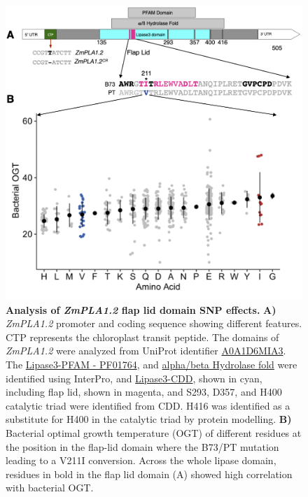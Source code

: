 \documentclass[9pt,twocolumn,twoside,lineno]{BioRxiv}
\begin{document}
\begin{figure}[ht]
\begin{center}
\includegraphics[width=0.4\paperwidth]{Figures/Fig_5.png}
\caption{\textbf{Analysis of \textit{ZmPLA1.2} flap lid domain SNP effects.}  
\textbf{A)} \textit{ZmPLA1.2} promoter and coding sequence showing different features. CTP represents the chloroplast transit peptide. 
The domains of \textit{ZmPLA1.2} were analyzed from UniProt identifier \hyperlink{https://www.uniprot.org/uniprot/A0A1D6MIA3}{A0A1D6MIA3}. 
The \hyperlink{https://www.ebi.ac.uk/interpro/entry/pfam/PF01764/}{Lipase3-PFAM - PF01764}, and \hyperlink{https://www.ebi.ac.uk/interpro/entry/InterPro/IPR029058/}{alpha/beta Hydrolase fold} were identified using InterPro, and \hyperlink{https://www.ncbi.nlm.nih.gov/Structure/cdd/cddsrv.cgi?uid=cd00519}{Lipase3-CDD}, shown in cyan, including flap lid, shown in magenta, and S293, D357, and H400 catalytic triad were identified from CDD. 
H416 was identified as a substitute for H400 in the catalytic triad by protein modelling.
\textbf{B)} Bacterial optimal growth temperature (OGT) of different residues at the position in the flap-lid domain where the B73/PT mutation leading to a V211I conversion. Across the whole lipase domain, residues in bold in the flap lid domain (A) showed high correlation with bacterial OGT.}
\label{Fig5}
\end{center}
\end{figure}
\end{document}
